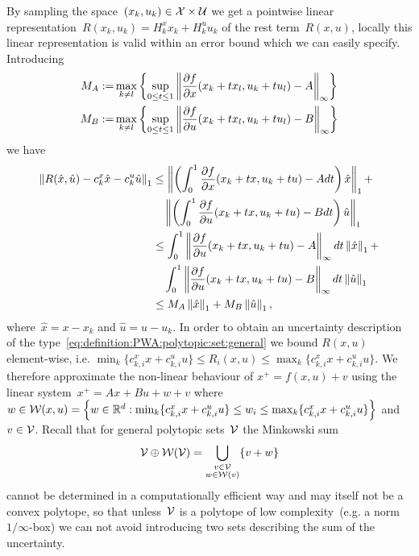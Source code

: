 %
By sampling the space~$(x_k,u_k)\in\mathcal X\times\mathcal U$ we get a pointwise linear representation~$R(x_k,u_k) = H_k^x x_k+ H_k^u u_k$ of the rest term~$R(x,u)$, locally this linear representation is valid within an error bound which we can easily specify.
%
Introducing
%
\begin{equation}\begin{aligned}
	M_A :=&\max_{k\neq l}\left\{\sup_{0\leq t\leq 1} \left\|\frac{\partial f}{\partial x}(x_k+tx_l,u_k+t u_l)-A\right\|_\infty\right\}\\
	M_B :=&\max_{k\neq l}\left\{\sup_{0\leq t\leq 1} \left\|\frac{\partial f}{\partial u}(x_k+tx_l,u_k+t u_l)-B\right\|_\infty\right\}
	\end{aligned}
\end{equation}
%
we have
%
\begin{equation}\label{eq:bound:on:linearisation:error:without:maximisation}
\begin{aligned}
	\left\|R(\hat x,\hat u)-c_k^x \hat x-c_k^u \hat u\right\|_1&\leq\left\|\left(\int_0^1 \frac{\partial f}{\partial x}(x_k+t x,u_k+t u)-Adt\right)\hat x\right\|_1 + \\
	&\quad \left\|\left(\int_0^1 \frac{\partial f}{\partial u}(x_k+t x,u_k+t u)-Bdt\right)\hat u\right\|_1\\
	&\leq \int_0^1\left\|\frac{\partial f}{\partial u}(x_k+t x,u_k+t u)-A\right\|_\infty dt\left\|\hat x\right\|_1 + \\
	&\quad \int_0^1\left\|\frac{\partial f}{\partial u}(x_k+t x,u_k+t u)-B\right\|_\infty dt \left\|\hat u\right\|_1\\
	&\leq M_A\left\|\hat x\right\|_1+M_B\left\|\hat u\right\|_1,
\end{aligned}\end{equation}
%
where~$\hat x = x-x_k$ and $\hat u = u-u_k$.
%
In order to obtain an uncertainty description of the type~\eqref{eq:definition:PWA:polytopic:set:general} we bound $R(x,u)$ element-wise, i.e.
$\min_{k}\{c_{k,i}^x x + c_{k,i}^u u\} \leq R_i(x,u)\leq\max_k\{c_{k,i}^x x + c_{k,i}^u u\}$.
%
We therefore approximate the non-linear behaviour of $x^+=f(x,u)+v$ using the linear system~$x^+=Ax+Bu+w+v$ where $w\in\mathcal W(x,u) = \left\{w\in\mathbb R^d:\min_{k}\{c_{k,i}^x x + c_{k,i}^u u\} \leq w_i \leq\max_k\{c_{k,i}^x x + c_{k,i}^u u\}\right\}$ and $v\in\mathcal V$.
%
Recall that for general polytopic sets~$\mathcal V$ the Minkowski sum 
%
$$
	\mathcal V\oplus\mathcal W(\mathcal V) = \bigcup_{\substack{v\in\mathcal V\\ w\in\mathcal W(v)}}\{v+w\}
$$
%
cannot be determined in a computationally efficient way and may itself not be a convex polytope, so that unless~$\mathcal V$ is a polytope of low complexity~(e.g. a norm $1/\infty$-box) we can not avoid introducing two sets describing the sum of the uncertainty.
